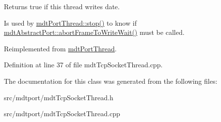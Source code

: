 Returns true if this thread writes date. 

Is used by \hyperlink{classmdt_port_thread_a5746ea96689ed80179751ad1353f0b39}{mdtPortThread::stop()} to know if \hyperlink{classmdt_abstract_port_ae67c815f68317c70e398eaa86622af6b}{mdtAbstractPort::abortFrameToWriteWait()} must be called. 

Reimplemented from \hyperlink{classmdt_port_thread_a0122a12262052cf3643241a3eaa31c58}{mdtPortThread}.



Definition at line 37 of file mdtTcpSocketThread.cpp.



The documentation for this class was generated from the following files:\begin{DoxyCompactItemize}
\item 
src/mdtport/mdtTcpSocketThread.h\item 
src/mdtport/mdtTcpSocketThread.cpp\end{DoxyCompactItemize}
